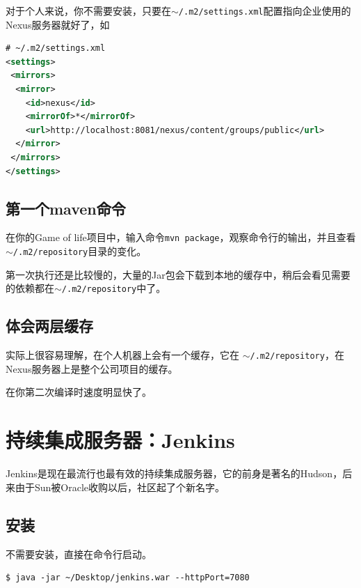 对于个人来说，你不需要安装，只要在\texttt{\ensuremath{\sim}\slash .m2\slash settings.xml}配置指向企业使用的Nexus服务器就好了，如

\begin{lstlisting}[language=xml]
# ~/.m2/settings.xml
<settings>
 <mirrors>
  <mirror>
    <id>nexus</id>
    <mirrorOf>*</mirrorOf>
    <url>http://localhost:8081/nexus/content/groups/public</url>
  </mirror>
 </mirrors>
</settings>
\end{lstlisting}

\subsection{第一个maven命令}
\label{第一个maven命令}

在你的Game of life项目中，输入命令\texttt{mvn package}，观察命令行的输出，并且查看 \texttt{\ensuremath{\sim}\slash .m2\slash repository}目录的变化。

第一次执行还是比较慢的，大量的Jar包会下载到本地的缓存中，稍后会看见需要的依赖都在\texttt{\ensuremath{\sim}\slash .m2\slash repository}中了。

\subsection{体会两层缓存}
\label{体会两层缓存}

实际上很容易理解，在个人机器上会有一个缓存，它在 \texttt{\ensuremath{\sim}\slash .m2\slash repository}，在Nexus服务器上是整个公司项目的缓存。

在你第二次编译时速度明显快了。

\section{持续集成服务器：Jenkins}
\label{持续集成服务器：jenkins}

Jenkins是现在最流行也最有效的持续集成服务器，它的前身是著名的Hudson，后来由于Sun被Oracle收购以后，社区起了个新名字。

\subsection{安装}
\label{安装}

不需要安装，直接在命令行启动。

\begin{verbatim}
$ java -jar ~/Desktop/jenkins.war --httpPort=7080
\end{verbatim}

